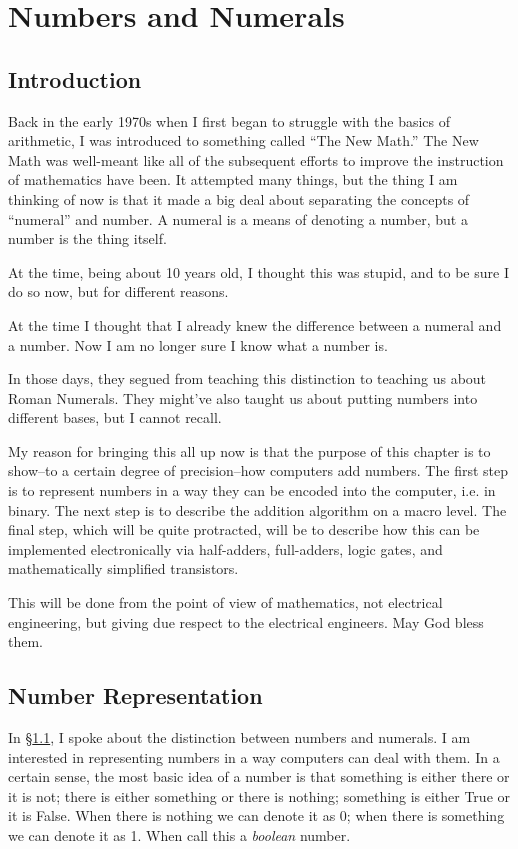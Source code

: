 \chapter{Numbers and Numerals}
\section{Introduction}\label{intro:numbers_and_numerals}
Back in the early 1970s when I first began to struggle with the basics of arithmetic, I was introduced to something called ``The New Math.''  The New Math was well-meant like all of the subsequent efforts to improve the instruction of mathematics have been.  It attempted many things, but the thing I am thinking of now is that it made a big deal about separating the concepts of ``numeral'' and number.  A numeral is a means of denoting a number, but a number is the thing itself.

At the time, being about 10 years old, I thought this was stupid, and to be sure I do so now, but for different reasons.

At the time I thought that I already knew the difference between a numeral and a number.  Now I am no longer sure I know what a number is.

In those days, they segued from teaching this distinction to teaching us about Roman Numerals.  They might've also taught us about putting numbers into different bases, but I cannot recall. 

My reason for bringing this all up now is that the purpose of this chapter is to show--to a certain degree of precision--how computers add numbers.  The first step is to represent numbers in a way they can be encoded into the computer, i.e. in binary. The next step is to describe the addition algorithm on a macro level.  The final step, which will be quite protracted, will be to describe how this can be implemented electronically via half-adders, full-adders, logic gates, and mathematically simplified transistors.

This will be done from the point of view of mathematics, not electrical engineering, but giving due respect to the electrical engineers. May God bless them.

\section{Number Representation}\label{section:number_representation}
In \S \ref{intro:numbers_and_numerals}, I spoke about the distinction between numbers and numerals.  I am interested in representing numbers in a way computers can deal with them.  In a certain sense, the most basic idea of a number is that something is either there or it is not; there is either something or there is nothing; something is either True or it is False.  When there is nothing we can denote it as 0; when there is something we can denote it as 1.  When call this a \emph{boolean} number. 

